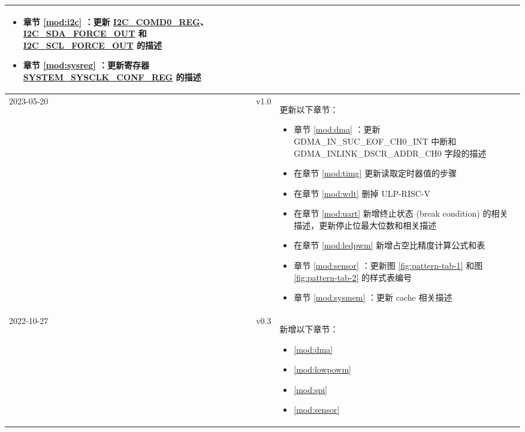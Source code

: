 \begin{longtable}[l]{ | m{2cm} | m{1.5cm} | m{12cm} | }
\begin{itemize}
        \item 章节 \ref{mod:i2c} \textit{\nameref{mod:i2c}}：更新 \hyperref[regdesc:I2CCOMD0REG]{I2C\_COMD0\_REG}、\hyperref[fielddesc:I2CSDAFORCEOUT]{I2C\_SDA\_FORCE\_OUT} 和 \hyperref[fielddesc:I2CSCLFORCEOUT]{I2C\_SCL\_FORCE\_OUT} 的描述 %
        \item 章节 \ref{mod:sysreg} \textit{\nameref{mod:sysreg}}：更新寄存器 \hyperref[regdesc:SYSTEMSYSCLKCONFREG]{SYSTEM\_SYSCLK\_CONF\_REG} 的描述 %
     \end{itemize}
     \\\hline
     2023-05-20 & v1.0 &
        更新以下章节：
            \begin{itemize}
                \item 章节 \ref{mod:dma} \textit{\nameref{mod:dma}}：更新 GDMA\_IN\_SUC\_EOF\_CH0\_INT 中断和 GDMA\_INLINK\_DSCR\_ADDR\_CH0 字段的描述 %
                \item 在章节 \ref{mod:timg} \textit{\nameref{mod:timg}} 更新读取定时器值的步骤 %
                \item 在章节 \ref{mod:wdt} \textit{\nameref{mod:wdt}} 删掉 ULP-RISC-V %
                \item 在章节 \ref{mod:uart} \textit{\nameref{mod:uart}} 新增终止状态 (break condition) 的相关描述，更新停止位最大位数和相关描述 %
                \item 在章节 \ref{mod:ledpwm} \textit{\nameref{mod:ledpwm}} 新增占空比精度计算公式和表 \textit{\nameref{tab:ledc-common-freq-res}} %
                \item 章节 \ref{mod:sensor} \textit{\nameref{mod:sensor}}：更新图 \ref{fig:pattern-tab-1} 和图 \ref{fig:pattern-tab-2} 的样式表编号
                \item 章节 \ref{mod:sysmem} \textit{\nameref{mod:sysmem}}：更新 cache 相关描述 %
            \end{itemize}
 \\\hline
     2022-10-27 & v0.3 &
        新增以下章节：
            \begin{itemize}
                \item \ref{mod:dma} \textit{\nameref{mod:dma}}
                \item \ref{mod:lowpowm} \textit{\nameref{mod:lowpowm}}
                \item \ref{mod:spi} \textit{\nameref{mod:spi}}
                \item \ref{mod:sensor} \textit{\nameref{mod:sensor}}

\end{itemize}
\end{longtable}
